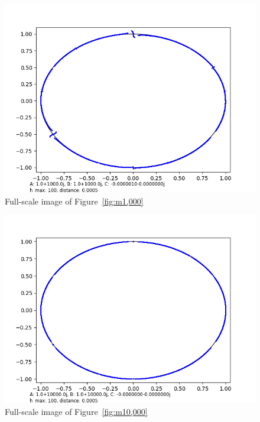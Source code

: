 \documentclass[12pt,a4paper,reqno,parskip=full]{amsart}
\numberwithin{equation}{section}
\theoremstyle{plain}
\theoremstyle{definition}
\begin{document}
\begin{figure}[H]
    \centering
    \includegraphics[width=\textwidth]{images/m/a1000,b1000,h100,d.0005.png}
    \caption{Full-scale image of Figure~\ref{fig:m1,000}}
\end{figure}

\begin{figure}[H]
    \centering
    \includegraphics[width=\textwidth]{images/m/a10,000,b10,000,h100,d.0005.png}
    \caption{Full-scale image of Figure~\ref{fig:m10,000}}
\end{figure}
\end{document}
